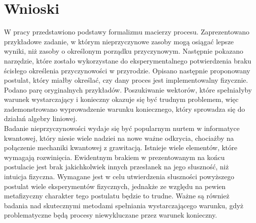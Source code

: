 \documentclass[10pt]{article} %
\begin{document}
\section{Wnioski}
W pracy przedstawiono podstawy formalizmu macierzy procesu. Zaprezentowano przykładowe zadanie, w którym nieprzyczynowe zasoby mogą osiągać lepsze wyniki, niż zasoby o określonym porządku przyczynowym. Następnie pokazano narzędzie, które zostało wykorzystane do eksperymentalnego potwierdzenia
braku ścisłego określenia przyczynowości w przyrodzie. Opisano następnie proponowany postulat, który miałby określać, czy dany proces jest implementowalny fizycznie. Podano parę oryginalnych przykładów. Poszukiwanie wektorów, które spełniałyby warunek wystarczający i konieczny okazuje się być trudnym problemem, więc zademonstrowano wyprowadzenie 
warunku koniecznego, który sprowadza się do działań algebry liniowej.\\
Badanie nieprzyczynowości wydaje się być popularnym nurtem w informatyce kwantowej, który niesie wiele nadziei na nowe ważne odkrycia, chociażby na połączenie mechaniki kwantowej z grawitacją. Istnieje wiele elementów, które wymagają rozwinięcia.
Ewidentnym brakiem w prezentowanym na końcu postulacie jest brak jakichkolwiek innych przesłanek na jego słuszność, niż intuicja fizyczna. Wymagane jest w celu utwierdzenia słuszności powyższego postulat wiele eksperymentów fizycznych, jednakże ze względu na pewien metafizyczny charakter tego postulatu będzie to trudne.
Ważne są również badania nad skutecznymi metodami spełniania wystarczającego warunku, gdyż problematyczne będą procesy niewykluczane przez warunek konieczny.

\renewcommand\appendixname{Dodatek}
\renewcommand\appendixpagename{Dodatek}
\newpage
\tableofcontents
\newpage
\listoffigures
\newpage
\end{document}
